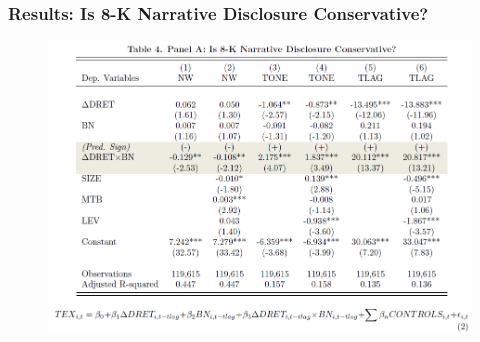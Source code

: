 \documentclass{beamer}
\begin{document}
\begin{frame}
\frametitle{Results: Is 8-K Narrative Disclosure Conservative?}
	\begin{figure}[h]
	\centering
	\includegraphics[width=0.9\linewidth]{tab4panA}
	\label{tab4panA}
	\end{figure}
\end{frame}
\end{document}

